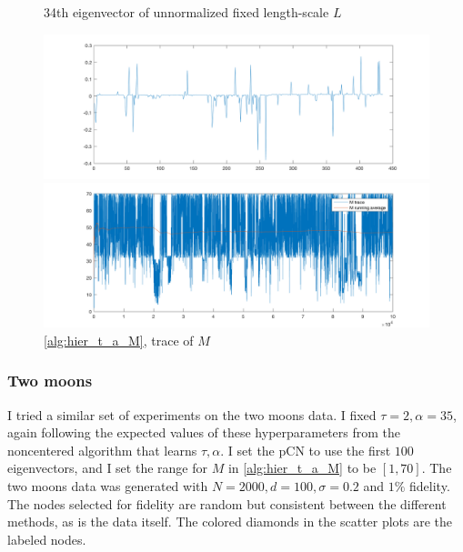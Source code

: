 \documentclass{siamart1116}
\begin{document}
            \begin{figure}[!htb]
            \begin{minipage}{0.48\textwidth}
                \centering
                \caption{\label{fig:voting_hier_eigenvector} 34th eigenvector of unnormalized fixed length-scale $L$}
                \includegraphics[width=\linewidth]{learnM/voting/hier/34_eigvec.png}
            \end{minipage}\hfill
            \begin{minipage}{0.48\textwidth}
                \centering
                \caption{\label{fig:voting_hier_M_trace} \cref{alg:hier_t_a_M}, trace of $M$}
                \includegraphics[width=\linewidth]{learnM/voting/hier/M_trace.png}
            \end{minipage}
            \end{figure}


        \subsubsection{Two moons}
            I tried a similar set of experiments on the two moons data. I fixed $\tau = 2, \alpha = 35$, again following the expected values of these hyperparameters from the noncentered algorithm that learns $\tau,\alpha$. I set the pCN to use the first $100$ eigenvectors, and I set the range for $M$ in \cref{alg:hier_t_a_M} to be $[1, 70]$. The two moons data was generated with $N=2000, d=100, \sigma = 0.2$ and $1\%$ fidelity. The nodes selected for fidelity are random but consistent between the different methods, as is the data itself. The colored diamonds in the scatter plots are the labeled nodes.
\end{document}
